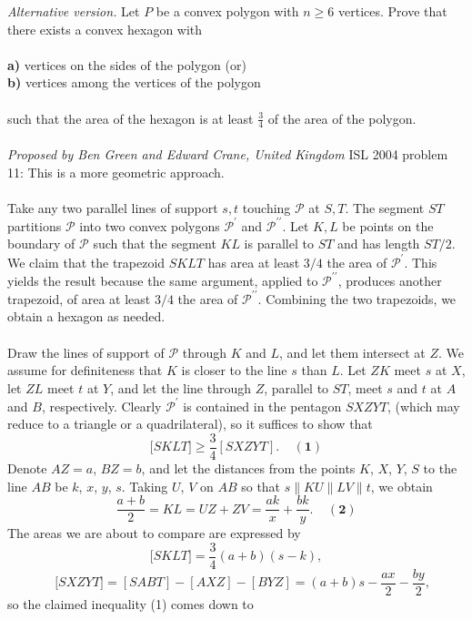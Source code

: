 \textit{Alternative version.} Let $P$ be a convex polygon with $n\geq 6$ vertices. Prove that there exists a convex hexagon with \\\\
\textbf{a)} vertices on the sides of the polygon (or) \\
\textbf{b)} vertices among the vertices of the polygon \\\\
such that the area of the hexagon is at least $\frac{3}{4}$ of the area of the polygon. \\\\
\textit{Proposed by Ben Green and Edward Crane, United Kingdom} 
ISL 2004 problem 11:  This is a more geometric approach. \\\\
Take any two parallel lines of support $s,t$ touching $\mathcal{P}$ at $S,T$. The segment $ST$ partitions $\mathcal{P }$ into two convex polygons $\mathcal{P}^{\prime}$ and $\mathcal{P} ^{\prime\prime}$. Let $K,L$ be points on the boundary of $\mathcal{P}$ such that the segment $KL$ is parallel to $ST$ and has length $ST/2$. We claim that the trapezoid $SKLT$ has area at least $3/4$ the area of $\mathcal{P} ^{\prime}$. This yields the result because the same argument, applied to $\mathcal{P}^{\prime\prime}$, produces another trapezoid, of area at least $3/4$ the area of $\mathcal{P}^{\prime\prime}$. Combining the two trapezoids, we obtain a hexagon as needed. \\\\
Draw the lines of support of $\mathcal{P}$ through $K$ and $L$, and let them intersect at $Z$. We assume for definiteness that $K$ is closer to the line $s$ than $L$. Let $ZK$ meet $s$ at $X$, let $ZL$ meet $t$ at $Y$, and let the line through $Z$, parallel to $ST$, meet $s$ and $t$ at $A$ and $B$, respectively. Clearly $\mathcal{P}^{\prime }$ is contained in the pentagon $SXZYT$,  (which may reduce to a triangle or a quadrilateral), so it suffices to show that
\[ \lbrack SKLT]\geq \frac{3}{4}[SXZYT].\ \ \ \ \ \mathbf{(1)} \]
Denote ${AZ=a}$, ${BZ=b}$, and let the distances from the points $K$, $X$, $Y$, $S$ to the line $AB$ be $k$, $x$, $y$, $s$. Taking $U$, $V$ on $AB$ so that ${s\parallel KU\parallel LV\parallel t}$, we obtain
\[ \frac{a+b}{2}=KL=UZ+ZV=\frac{ak}{x}+\frac{bk}{y}.\ \ \ \ \ \mathbf{(2)} \]
The areas we are about to compare are expressed by
\[ \lbrack SKLT]=\frac{3}{4}(a+b)(s-k), \]
\[ \quad \lbrack SXZYT]=[SABT]-[AXZ]-[BYZ]=(a+b)s-\frac{ax}{2}-\frac{by}{2}, \]
so the claimed inequality (1) comes down to
